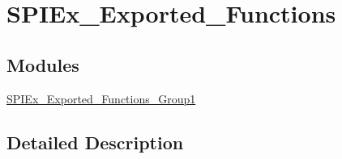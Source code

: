 \hypertarget{group___s_p_i_ex___exported___functions}{}\section{S\+P\+I\+Ex\+\_\+\+Exported\+\_\+\+Functions}
\label{group___s_p_i_ex___exported___functions}
\subsection*{Modules}
\begin{DoxyCompactItemize}
\item 
\hyperlink{group___s_p_i_ex___exported___functions___group1}{S\+P\+I\+Ex\+\_\+\+Exported\+\_\+\+Functions\+\_\+\+Group1}
\end{DoxyCompactItemize}


\subsection{Detailed Description}
